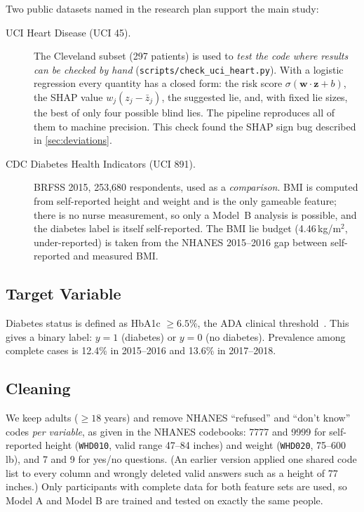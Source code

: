 \documentclass[12pt, a4paper, oneside]{report}
\theoremstyle{definition}
\begin{document}
Two public datasets named in the research plan support the main study:
\begin{description}
  \item[UCI Heart Disease (UCI 45).] The Cleveland subset (297 patients)
       is used to \emph{test the code where results can be checked by
       hand} (\texttt{scripts/check\_uci\_heart.py}). With a logistic
       regression every quantity has a closed form: the risk score
       $\sigma(\mathbf{w}\cdot\mathbf{z}+b)$, the SHAP value
       $w_j(z_j-\bar z_j)$, the suggested lie, and, with fixed lie sizes,
       the best of only four possible blind lies. The pipeline reproduces
       all of them to machine precision. This check found the SHAP sign
       bug described in \cref{sec:deviations}.
  \item[CDC Diabetes Health Indicators (UCI 891).] BRFSS 2015, 253,680
       respondents, used as a \emph{comparison}. BMI is computed from
       self-reported height and weight and is the only gameable feature;
       there is no nurse measurement, so only a Model~B analysis is
       possible, and the diabetes label is itself self-reported. The BMI
       lie budget (4.46\,kg/m$^2$, under-reported) is taken from the
       NHANES 2015--2016 gap between self-reported and measured BMI.
\end{description}

\subsection{Target Variable}

Diabetes status is defined as HbA1c $\geq 6.5\%$, the ADA clinical
threshold~\citep{ada2023standards}. This gives a binary label:
$y = 1$ (diabetes) or $y = 0$ (no diabetes). Prevalence among complete
cases is 12.4\% in 2015--2016 and 13.6\% in 2017--2018.

\subsection{Cleaning}

We keep adults ($\geq 18$ years) and remove NHANES ``refused'' and
``don't know'' codes \emph{per variable}, as given in the NHANES
codebooks: 7777 and 9999 for self-reported height (\texttt{WHD010},
valid range 47--84 inches) and weight (\texttt{WHD020}, 75--600 lb),
and 7 and 9 for yes/no questions. (An earlier version applied one
shared code list to every column and wrongly deleted valid answers
such as a height of 77 inches.) Only participants with complete data
for both feature sets are used, so Model A and Model B are trained and
tested on exactly the same people.
\end{document}
